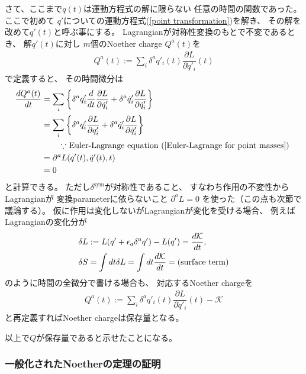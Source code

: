 さて、ここまで$q(t)$は運動方程式の解に限らない
任意の時間の関数であった。
ここで初めて
$q'$についての運動方程式(\ref{point transformation})を解き、
その解を改めて$q'(t)$と呼ぶ事にする。
Lagrangianが対称性変換のもとで不変であるとき、
解$q'(t)$に対し
$m$個のNoether charge $Q^a(t)$を
\begin{align}
  Q^a(t):=
  \sum_i
    \delta^a q'_i (t)
  \dfrac{\partial L}{\partial \dot{q}'_i} (t)
\end{align}
で定義すると、
その時間微分は
\begin{align}
  \dfrac{d Q^a(t)}{dt}
&=
  \sum_i
  \bigg\{
    \delta^a q'_i
  \dfrac{d}{dt}\dfrac{\partial L}{\partial \dot{q}'_i }
+
    \delta^a \dot{q}'_i
    \dfrac{\partial L}{\partial \dot{q}'_i}
  \bigg\}
\notag\\&=
  \sum_i
  \bigg\{
      \delta^a q'_i
    \dfrac{\partial L}{\partial q'_i}
  +
      \delta^a \dot{q}'_i
    \dfrac{\partial L}{\partial \dot{q}'_i}
  \bigg\}
\notag\\&\qquad
    \text{
      $\because$ Euler-Lagrange equation
      (\ref{Euler-Lagrange for point masses})
    }
\notag\\&=
  \partial^a L(q'(t),\dot{q}'(t),t)
  \notag\\&= 0
\end{align}
と計算できる。
ただし$\delta^{\mathrm{sym}}$が対称性であること、
すなわち作用の不変性からLagrangianが
変換parameterに依らないこと
$\partial^a L = 0$
を使った（この点も次節で議論する）。
仮に作用は変化しないがLagrangianが変化を受ける場合、
例えばLagrangianの変化分が
\begin{align}
  \delta L &:= L( q' + \epsilon_a \delta^a q' ) - L( q' )
  = \dfrac{d \mathcal{K}}{dt}
  ,\notag\\
  \delta S &= \int dt \delta L
  = \int dt \dfrac{d \mathcal{K}}{dt}
  = \text{(surface term)}
\end{align}
のように時間の全微分で書ける場合も、
対応するNoether chargeを
\begin{align}
  Q^a(t):=
  \sum_i
    \delta^a q'_i (t)
  \dfrac{\partial L}{\partial \dot{q}'_i} (t)
  -
  \mathcal{K}
\end{align}
と再定義すればNoether chargeは保存量となる。

以上で$Q$が保存量であると示せたことになる。

\subsubsection{一般化されたNoetherの定理の証明}

